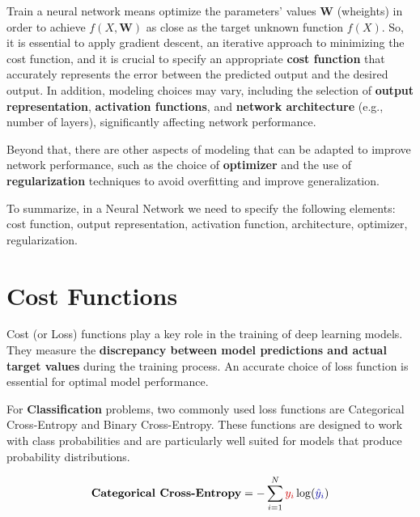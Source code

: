 Train a neural network means optimize the parameters' values $\mathbf{W}$ (wheights) in order to achieve $f(X,\mathbf{W})$ as close as the target unknown function $f(X)$. So, it is essential to apply gradient descent, an iterative approach to minimizing the cost function, and it is crucial to specify an appropriate \textbf{cost function} that accurately represents the error between the predicted output and the desired output. In addition, modeling choices may vary, including the selection of \textbf{output representation}, \textbf{activation functions}, and \textbf{network architecture} (e.g., number of layers), significantly affecting network performance.

Beyond that, there are other aspects of modeling that can be adapted to improve network performance, such as the choice of \textbf{optimizer} and the use of \textbf{regularization} techniques to avoid overfitting and improve generalization. 

To summarize, in a Neural Network we need to specify the following elements: cost function, output representation, activation function, architecture, optimizer, regularization.

\section{Cost Functions}

Cost (or Loss) functions play a key role in the training of deep learning models. They measure the \textbf{discrepancy between model predictions and actual target values} during the training process. An accurate choice of loss function is essential for optimal model performance.

For \textbf{Classification} problems, two commonly used loss functions are Categorical Cross-Entropy and Binary Cross-Entropy. These functions are designed to work with class probabilities and are particularly well suited for models that produce probability distributions.

{\Large
\begin{equation*}
\text{\textbf{Categorical Cross-Entropy}} = -\sum_{i=1}^{N} \tikzmarkk{Y}\textcolor{myred}{y_i} \log(\tikzmarkk{YC}\textcolor{mybluee}{\hat{y}_i})
\end{equation*}
}

